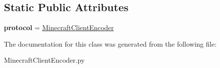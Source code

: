 \subsection*{Static Public Attributes}
\begin{DoxyCompactItemize}
\item 
\hypertarget{classMinecraftClientEncoder_1_1MinecraftEncoderFactory_a6a94c5dbd65bda20f39399acdb9de9e9}{{\bfseries protocol} = \hyperlink{classMinecraftClientEncoder_1_1MinecraftClientEncoder}{Minecraft\-Client\-Encoder}}\label{classMinecraftClientEncoder_1_1MinecraftEncoderFactory_a6a94c5dbd65bda20f39399acdb9de9e9}

\end{DoxyCompactItemize}


The documentation for this class was generated from the following file\-:\begin{DoxyCompactItemize}
\item 
Minecraft\-Client\-Encoder.\-py\end{DoxyCompactItemize}

